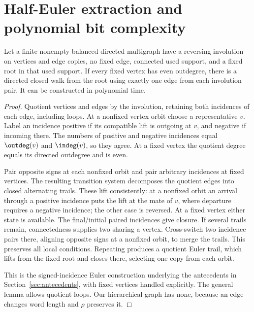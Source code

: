 \section{Half-Euler extraction and polynomial bit complexity}\label{sec:extraction}
\begin{lemma}\label{lem:half-euler}
Let a finite nonempty balanced directed multigraph have a reversing
involution on vertices and edge copies, no fixed edge, connected used
support, and a fixed root in that used support. If every fixed vertex has even outdegree,
there is a directed closed walk from the root using exactly one edge
from each involution pair. It can be constructed in polynomial time.
\end{lemma}
\begin{proof}
Quotient vertices and edges by the involution, retaining both incidences
of each edge, including loops. At a nonfixed vertex orbit choose a
representative $v$. Label an incidence positive if its compatible lift
is outgoing at $v$, and negative if incoming there. The numbers of
positive and negative incidences equal $\outdeg(v)$ and $\indeg(v)$,
so they agree. At a fixed vertex the quotient degree equals its directed
outdegree and is even.

Pair opposite signs at each nonfixed orbit and pair arbitrary incidences
at fixed vertices. The resulting transition system decomposes the
quotient edges into closed alternating trails. These lift consistently:
at a nonfixed orbit an arrival through a positive incidence puts the
lift at the mate of $v$, where departure requires a negative incidence;
the other case is reversed. At a fixed vertex either state is available.
The final/initial paired incidences give closure. If several trails
remain, connectedness supplies two sharing a vertex. Cross-switch two
incidence pairs there, aligning opposite signs at a nonfixed orbit,
to merge the trails. This preserves all local conditions. Repeating
produces a quotient Euler trail, which lifts from the fixed root and
closes there, selecting one copy from each orbit.

This is the signed-incidence Euler construction underlying the
antecedents in Section~\ref{sec:antecedents}, with fixed vertices handled
explicitly. The general lemma allows quotient loops. Our hierarchical
graph has none, because an edge changes word length and $\rho$
preserves it.
\end{proof}


